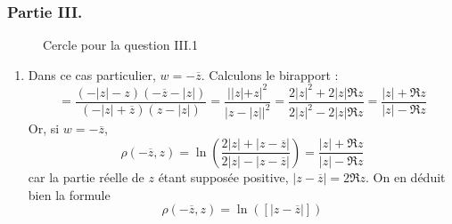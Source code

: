 \subsubsection*{Partie III.}
\begin{figure}[ht]
 \centering

\caption{Cercle pour la question III.1}
\label{fig:Cdisthyp_2}
\end{figure}

\begin{enumerate}
 \item Dans ce cas particulier, $w=-\overline{z}$. Calculons le birapport :
\begin{displaymath}
 [-|z|,-\overline{z},z,|z|]=\dfrac{(-|z|-z)(-\overline{z}-|z|)}{(-|z|+\overline{z})(z-|z|)}
= \dfrac{||z|+z|^2}{|z-|z||^2}=\dfrac{2|z|^2+2|z|\Re z}{2|z|^2-2|z|\Re z}=\dfrac{|z|+\Re z}{|z|-\Re z}
\end{displaymath}
Or, si $w=-\overline{z}$,
\begin{displaymath}
 \rho(-\overline{z},z)=\ln\left( \dfrac{2|z|+|z-\overline{z}|}{2|z|-|z-\overline{z}|}\right) 
=\dfrac{|z|+\Re z}{|z|-\Re z}
\end{displaymath}
car la partie réelle de $z$ étant supposée positive, $|z-\overline{z}|=2\Re z$. On en déduit bien la formule
\begin{displaymath}
 \rho(-\overline{z},z)=\ln([|z-\overline{z}|])
\end{displaymath}


\end{enumerate}
